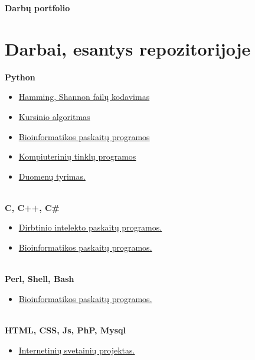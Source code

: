 \documentclass[a4paper,12pt]{article}
\begin{document}
\graphicspath{ {/} }

\renewcommand{\cftdot}{.}	
\renewcommand{\cftsecleader}{\cftdotfill{\cftdotsep}}

\thispagestyle{empty} %


\begin{center}
\textbf{Darbų portfolio} \\
\end{center}
\vspace{0.5cm}
\normalsize
\section{Darbai, esantys repozitorijoje}

\textbf{Python}
\begin{itemize}
	\item \href{https://github.com/Luksys5/LT_programos/tree/code}{Hamming, Shannon failų kodavimas}
	\item 
\href{https://github.com/Luksys5/LT_programos/tree/Bakalaurinis}{Kursinio algoritmas}
	\item 
\href{https://github.com/Luksys5/LT_programos/tree/Biotrees}{Bioinformatikos paskaitų programos}
	\item 
\href{https://github.com/Luksys5/LT_programos/tree/tinklai}{Kompiuterinių tinklų programos}
	\item 
\href{}{Duomenų tyrimas.} \\\\
\end{itemize}

\textbf{C, C++, C\#}
\begin{itemize}
	\item 
\href{}{Dirbtinio intelekto paskaitų programos.}
	\item 
\href{}{Bioinformatikos paskaitų programos.} \\\\
\end{itemize}

\textbf{Perl, Shell, Bash}
\begin{itemize}
	\item 
\href{https://github.com/Luksys5/LT_programos/tree/GNU-PERL}{Bioinformatikos paskaitų programos.}\\\\ 
\end{itemize} 


\textbf{HTML, CSS, Js, PhP, Mysql}
\begin{itemize}
	\item 	\href{https://github.com/Luksys5/LT_programos/tree/Tinklapiai}{Internetinių svetainių projektas.}\\\\ 
\end{itemize}
\end{document}
